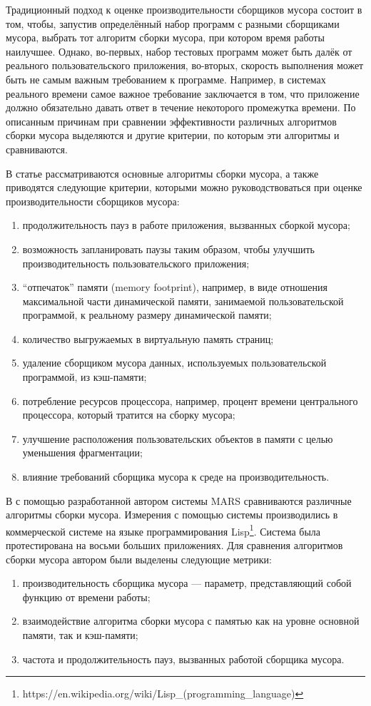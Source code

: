 \documentclass[12pt,a4paper]{article}
\begin{document}
Традиционный подход к оценке производительности сборщиков мусора состоит в том, чтобы,
запустив определённый набор программ с разными сборщиками мусора, выбрать тот 
алгоритм сборки мусора, при котором время работы наилучшее. Однако, во-первых, набор
тестовых программ может быть далёк от реального пользовательского приложения, во-вторых,
скорость выполнения может быть не самым важным требованием к программе. Например, в системах
реального времени самое важное требование заключается в том, что приложение должно
обязательно давать ответ в течение некоторого промежутка времени. По описанным причинам
при сравнении эффективности различных алгоритмов сборки мусора выделяются и другие критерии,
по которым эти алгоритмы и сравниваются. 

В статье \cite{book:goetz} рассматриваются основные алгоритмы сборки мусора, а также 
приводятся следующие критерии, которыми можно руководствоваться при оценке производительности
сборщиков мусора:
\begin{enumerate}
\item продолжительность пауз в работе приложения, вызванных сборкой мусора;
\item возможность запланировать паузы таким образом,
чтобы улучшить производительность пользовательского приложения;
\item ``отпечаток'' памяти (memory footprint), например, в виде отношения максимальной части динамической 
памяти, занимаемой пользовательской программой, к реальному размеру динамической памяти;
\item количество выгружаемых в виртуальную память страниц;
\item удаление сборщиком мусора данных, используемых пользовательской
программой, из кэш-памяти;
\item потребление ресурсов процессора, например, процент времени центрального процессора,
который тратится на сборку мусора;
\item улучшение расположения пользовательских объектов в памяти с целью уменьшения 
фрагментации;
\item влияние требований сборщика мусора к среде на производительность. 
\end{enumerate}

В \cite{book:Zorn} с помощью разработанной автором системы MARS сравниваются различные 
алгоритмы сборки мусора. Измерения с помощью системы производились в коммерческой системе на языке
программирования Lisp\footnote{https://en.wikipedia.org/wiki/Lisp\_(programming\_language)}.
Система была протестирована на восьми больших приложениях. Для сравнения алгоритмов сборки мусора 
автором были выделены следующие метрики:
\begin{enumerate}
\item производительность сборщика мусора --- параметр, представляющий собой функцию от
времени работы;
\item взаимодействие алгоритма сборки мусора с памятью как на уровне основной памяти, так и кэш-памяти;
\item частота и продолжительность пауз, вызванных работой сборщика мусора.
\end{enumerate}
\end{document}
